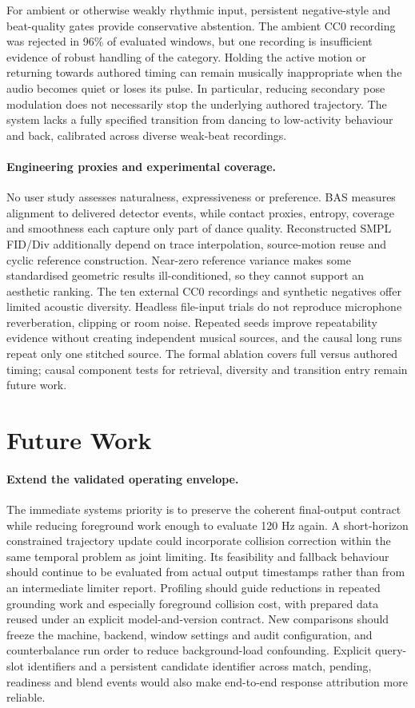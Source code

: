 For ambient or otherwise weakly rhythmic input, persistent negative-style and
beat-quality gates provide conservative abstention. The ambient CC0 recording
was rejected in 96\% of evaluated windows, but one recording is insufficient
evidence of robust handling of the category. Holding the active motion or
returning towards authored timing can remain musically inappropriate when the
audio becomes quiet or loses its pulse. In particular, reducing secondary pose
modulation does not necessarily stop the underlying authored trajectory. The
system lacks a fully specified transition from dancing to low-activity behaviour
and back, calibrated across diverse weak-beat recordings.

\paragraph{Engineering proxies and experimental coverage.}
No user study assesses naturalness, expressiveness or preference. BAS measures
alignment to delivered detector events, while contact proxies, entropy,
coverage and smoothness each capture only part of dance quality. Reconstructed
SMPL FID/Div additionally depend on trace interpolation, source-motion reuse
and cyclic reference construction. Near-zero reference variance makes some
standardised geometric results ill-conditioned, so they cannot support an
aesthetic ranking. The ten external CC0 recordings and synthetic negatives
offer limited acoustic diversity. Headless file-input trials do not reproduce
microphone reverberation, clipping or room noise. Repeated seeds improve
repeatability evidence without creating independent musical sources, and the
causal long runs repeat only one stitched source. The formal ablation covers
full versus authored timing; causal component tests for retrieval, diversity
and transition entry remain future work.

\section{Future Work}
\label{sec:ch7_future_work}

\paragraph{Extend the validated operating envelope.}
The immediate systems priority is to preserve the coherent final-output contract
while reducing foreground work enough to evaluate 120 Hz again. A short-horizon
constrained trajectory update could incorporate collision correction within the
same temporal problem as joint limiting. Its feasibility and fallback behaviour
should continue to be evaluated from actual output timestamps rather than from
an intermediate limiter report. Profiling should guide reductions in repeated
grounding work and especially foreground collision cost, with prepared data
reused under an explicit model-and-version contract. New comparisons should
freeze the machine, backend,
window settings and audit configuration, and counterbalance run order to reduce
background-load confounding. Explicit query-slot identifiers and a persistent
candidate identifier across match, pending, readiness and blend events would
also make end-to-end response attribution more reliable.

